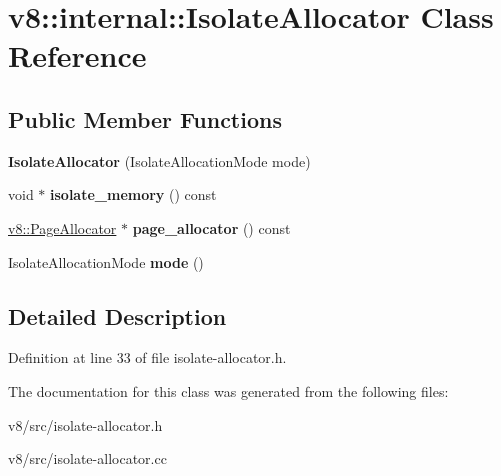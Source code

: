 \hypertarget{classv8_1_1internal_1_1IsolateAllocator}{}\section{v8\+:\+:internal\+:\+:Isolate\+Allocator Class Reference}
\label{classv8_1_1internal_1_1IsolateAllocator}
\subsection*{Public Member Functions}
\begin{DoxyCompactItemize}
\item 
\mbox{\label{classv8_1_1internal_1_1IsolateAllocator_abbe1d9f606841e913e0b30488a25ff8a}} 
{\bfseries Isolate\+Allocator} (Isolate\+Allocation\+Mode mode)
\item 
\mbox{\label{classv8_1_1internal_1_1IsolateAllocator_a4e143421a1bef10e125bc628d3118628}} 
void $\ast$ {\bfseries isolate\+\_\+memory} () const
\item 
\mbox{\label{classv8_1_1internal_1_1IsolateAllocator_a0f8962dd5786e4fca9cb4cbb0391357c}} 
\mbox{\hyperlink{classv8_1_1PageAllocator}{v8\+::\+Page\+Allocator}} $\ast$ {\bfseries page\+\_\+allocator} () const
\item 
\mbox{\label{classv8_1_1internal_1_1IsolateAllocator_ac3b0fed61579c80e800be19dc8da6a04}} 
Isolate\+Allocation\+Mode {\bfseries mode} ()
\end{DoxyCompactItemize}


\subsection{Detailed Description}


Definition at line 33 of file isolate-\/allocator.\+h.



The documentation for this class was generated from the following files\+:\begin{DoxyCompactItemize}
\item 
v8/src/isolate-\/allocator.\+h\item 
v8/src/isolate-\/allocator.\+cc\end{DoxyCompactItemize}
